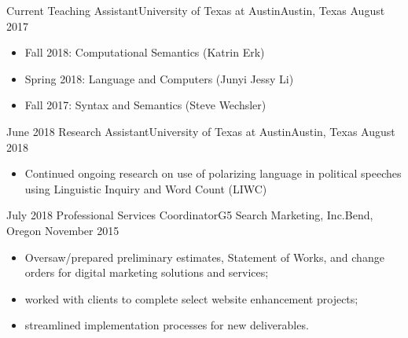%
%
%
\begin{experiences}
  \experience
    {Current}   {Teaching Assistant}{University of Texas at Austin}{Austin, Texas}
    {August 2017} {
                      \begin{itemize}
                        \item Fall 2018: Computational Semantics (Katrin Erk) 
                        \item Spring 2018: Language and Computers (Junyi Jessy Li)
                        \item Fall 2017: Syntax and Semantics (Steve Wechsler)
                      \end{itemize}
                    }{}
  \emptySeparator
  \experiencetech
    {June 2018} {Research Assistant}{University of Texas at Austin}{Austin, Texas}
    {August 2018}    {
                      \begin{itemize}
                        \item Continued ongoing research on use of polarizing language in political speeches using Linguistic Inquiry and Word Count (LIWC)                       
                      \end{itemize}
                    }
  \emptySeparator
  \experiencetech
    {July 2018}     {Professional Services Coordinator}{G5 Search Marketing, Inc.}{Bend, Oregon}
    {November 2015}    {
                      \begin{itemize}
                        \item Oversaw/prepared preliminary estimates, Statement of Works, and change orders for digital marketing solutions and services; 
                        \item worked with clients to  complete select website enhancement projects; 
                        \item streamlined implementation processes for new deliverables.


\end{itemize}}
\end{experiences}
